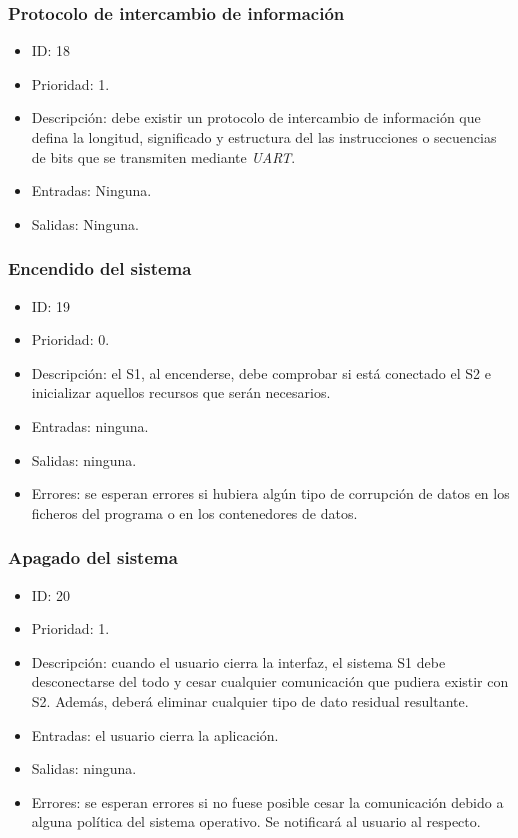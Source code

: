 \subsubsection{Protocolo de intercambio de información}
\begin{itemize}
    \item ID: 18
    \item Prioridad: 1.
    \item Descripción: debe existir un protocolo de intercambio de información que defina la longitud, significado y estructura del las instrucciones o secuencias de bits que se transmiten mediante \textit{UART}.
    \item Entradas: Ninguna.
    \item Salidas: Ninguna.
\end{itemize}    

\subsubsection{Encendido del sistema}
\begin{itemize}
    \item ID: 19
    \item Prioridad: 0.
    \item Descripción: el \ac{S1}, al encenderse, debe comprobar si está conectado el \ac{S2} e inicializar aquellos recursos que serán necesarios.
    \item Entradas: ninguna.
    \item Salidas: ninguna.
    \item Errores: se esperan errores si hubiera algún tipo de corrupción de datos en los ficheros del programa o en los contenedores de datos.
\end{itemize}

\subsubsection{Apagado del sistema}
\begin{itemize}
    \item ID: 20
    \item Prioridad: 1.
    \item Descripción: cuando el usuario cierra la interfaz, el sistema \ac{S1} debe desconectarse del todo y cesar cualquier comunicación que pudiera existir con \ac{S2}. Además, deberá eliminar cualquier tipo de dato residual resultante.
    \item Entradas: el usuario cierra la aplicación.
    \item Salidas: ninguna.
    \item Errores: se esperan errores si no fuese posible cesar la comunicación debido a alguna política del sistema operativo. Se notificará al usuario al respecto.
\end{itemize}

